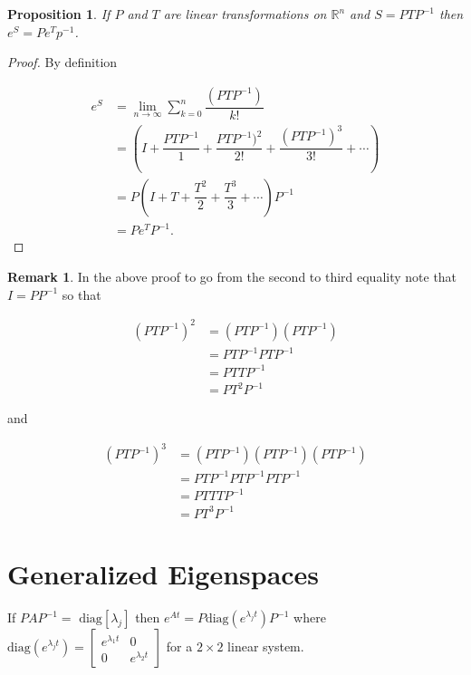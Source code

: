 \documentclass[12pt]{article}
\newtheorem*{proposition}{Proposition}
\theoremstyle{definition}
\newtheorem*{remark}{Remark}
\begin{document}
\begin{proposition}
If $P$ and $T$ are linear transformations on $\mathbb{R}^n$ and $S = PTP^{-1}$ then $e^S = P e^{T} p^{-1}$.
\end{proposition}

\begin{proof}
By definition

\begin{equation*}
\begin{split}
e^S &= \lim_{n \rightarrow \infty} \sum^{n}_{k = 0} \dfrac{(PTP^{-1})}{k!} \\
&= \left( I + \dfrac{PTP^{-1}}{1} + \dfrac{PTP^{-1})^2}{2!} + \dfrac{(PTP^{-1})^3}{3!} + \cdots \right) \\
&= P \left( I + T + \dfrac{T^2}{2} + \dfrac{T^3}{3} + \cdots \right)P^{-1} \\
&= Pe^{T}P^{-1}.
\end{split}
\end{equation*}
\end{proof}

\begin{remark}
In the above proof to go from the second to third equality note that $I = PP^{-1}$ so that

\begin{equation*}
\begin{split}
(PTP^{-1})^2 &= (PTP^{-1})(PTP^{-1}) \\
&= PTP^{-1}PTP^{-1} \\
&= PTTP^{-1} \\
&= PT^2P^{-1}
\end{split}
\end{equation*}

and 

\begin{equation*}
\begin{split}
(PTP^{-1})^3 &= (PTP^{-1})(PTP^{-1})(PTP^{-1}) \\
&= PTP^{-1}PTP^{-1}PTP^{-1} \\
&= PTTTP^{-1} \\
&= PT^3P^{-1}
\end{split}
\end{equation*}
\end{remark}

\section{Generalized Eigenspaces}

If $PAP^{-1} = \text{ diag}[\lambda_j]$ then $e^{At} = P \text{diag}(e^{\lambda_j t})P^{-1}$ where 
$\text{diag}(e^{\lambda_j t}) = \begin{bmatrix} e^{\lambda_1 t} & 0 \\ 0 & e^{\lambda_2 t} \end{bmatrix}$
for a $2 \times 2$ linear system.
\end{document}
